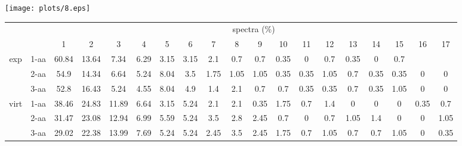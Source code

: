 \documentclass{article}
\begin{document}
\texttt{[image: plots/8.eps]}\begin{table}[h]\tiny
\vspace{3mm}
{\centering
\begin{center}
\begin{tabular}{|c|l|c|c|c|c|c|c|c|c|c|c|c|c|c|c|c|c|c|}
  \hline
  \multicolumn{2}{|c|}{ } & \multicolumn{ 17 }{|c|}{ spectra (\%)} \\
  \cline{3- 19}
  \multicolumn{2}{|c|}{ }  & 1 & 2 & 3 & 4 & 5 & 6 & 7 & 8 & 9 & 10 & 11 & 12 & 13 & 14 & 15 & 16 & 17\\
  \hline
  \multirow{3}{*}{exp}
&  1-aa  & 60.84 & 13.64 & 7.34 & 6.29 & 3.15 & 3.15 & 2.1 & 0.7 & 0.7 & 0.35 & 0 & 0.7 & 0.35 & 0 & 0.7 &  & \\&  2-aa  & 54.9 & 14.34 & 6.64 & 5.24 & 8.04 & 3.5 & 1.75 & 1.05 & 1.05 & 0.35 & 0.35 & 1.05 & 0.7 & 0.35 & 0.35 & 0 & 0\\&  3-aa  & 52.8 & 16.43 & 5.24 & 4.55 & 8.04 & 4.9 & 1.4 & 2.1 & 0.7 & 0.7 & 0.35 & 0.35 & 0.7 & 0.35 & 1.05 & 0 & 0\\ \hline
  \multirow{3}{*}{virt} 
&  1-aa  & 38.46 & 24.83 & 11.89 & 6.64 & 3.15 & 5.24 & 2.1 & 2.1 & 0.35 & 1.75 & 0.7 & 1.4 & 0 & 0 & 0 & 0.35 & 0.7\\&  2-aa  & 31.47 & 23.08 & 12.94 & 6.99 & 5.59 & 5.24 & 3.5 & 2.8 & 2.45 & 0.7 & 0 & 0.7 & 1.05 & 1.4 & 0 & 0 & 1.05\\&  3-aa  & 29.02 & 22.38 & 13.99 & 7.69 & 5.24 & 5.24 & 2.45 & 3.5 & 2.45 & 1.75 & 0.7 & 1.05 & 0.7 & 0.7 & 1.05 & 0 & 0.35\\ \hline
\end{tabular}
\end{center}
\par}
\centering
\vspace{3mm}
\label{table:longest-correct-d-tag}
\end{table}
\end{document}
